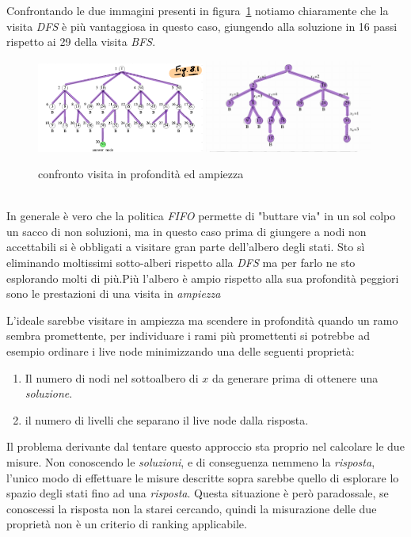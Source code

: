 \documentclass[a4paper]{article}
\begin{document}
\begin{adjustwidth}{.8cm}{0cm}
	Confrontando le due immagini presenti in figura~\ref{FIG:C_2_DFSvsBFS} notiamo chiaramente che la visita \textit{DFS} è più vantaggiosa in questo caso, giungendo alla soluzione in 16 passi rispetto ai 29 della visita \textit{BFS}.\\
\begin{figure}[!ht]
\centering
\includegraphics[width=0.49\textwidth]{./img/C_2_BFS.png}
\includegraphics[width=0.49\textwidth]{./img/C_2_DFS.png}
\caption{confronto visita in profondità ed ampiezza} \label{FIG:C_2_DFSvsBFS}
\end{figure}\\ 
In generale è vero che la politica \textit{FIFO} permette di "buttare via" in un sol colpo un sacco di non soluzioni, ma in questo caso prima di giungere a nodi non accettabili si è obbligati a visitare gran parte dell'albero degli stati.
Sto sì eliminando moltissimi sotto-alberi rispetto alla \textit{DFS} ma per farlo ne sto esplorando molti di più.Più l'albero è ampio rispetto alla sua profondità peggiori sono le prestazioni di una visita in \textit{ampiezza}



L'ideale sarebbe visitare in ampiezza ma scendere in profondità quando un ramo sembra promettente, per individuare i rami più promettenti si potrebbe ad esempio ordinare i live node minimizzando una delle seguenti proprietà:
\begin{enumerate}
	\item Il numero di nodi nel sottoalbero di $x$ da generare prima di ottenere una \emph{soluzione}.
	\item il numero di livelli che separano il live node dalla risposta.
\end{enumerate}
Il problema derivante dal tentare questo approccio sta proprio nel calcolare le due misure.
Non conoscendo le \textit{soluzioni}, e di conseguenza nemmeno la \textit{risposta}, l'unico modo di effettuare le misure descritte sopra sarebbe quello di esplorare lo spazio degli stati fino ad una \textit{risposta}.
Questa situazione è però paradossale, se conoscessi la risposta non la starei cercando, quindi la misurazione delle due proprietà non è un criterio di ranking applicabile.
\end{adjustwidth}
\end{document}
